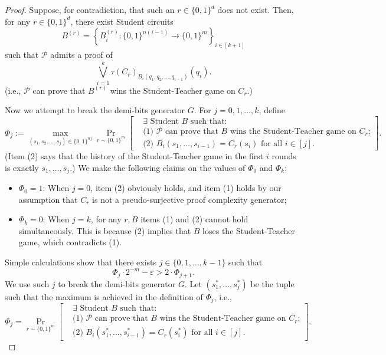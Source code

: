 \documentclass[10pt,a4paper]{article}
\theoremstyle{definition}
\theoremstyle{remark}
\newcommand{\eps}{\varepsilon}
\newcommand{\calP}{\mathcal{P}}
\begin{document}
\begin{proof}
    Suppose, for contradiction, that such an $r\in \{0,1\}^d$ does not exist. Then, for any $r\in\{0,1\}^d$, there exist Student circuits
    \[
        B^{(r)}=\left\{B_i^{(r)}\colon \{0,1\}^{n(i-1)}\to\{0,1\}^m\right\}_{i\in[k+1]}
    \]
    such that $\calP$ admits a proof of
    \[
        \bigvee_{i=1}^k\tau(C_r)_{B_{i}(q_1,q_2,\dots,q_{i-1})}(q_i).
    \]
    (i.e., $\calP$ can prove that $B^{(r)}$ wins the Student-Teacher game on $C_r$.)

    Now we attempt to break the demi-bits generator $G$. For $j=0,1,\dots,k$, define
    \[
        \Phi_j:=\max_{(s_1,s_2,\dots,s_j)\in\{0,1\}^{nj}}\Pr_{r\sim\{0,1\}^m}\left[\begin{aligned}
            &\text{$\exists$ Student $B$ such that:}\\
            &\text{(1) $\calP$ can prove that $B$ wins the Student-Teacher game on $C_r$;}\\
            &\text{(2) $B_i(s_1,\dots,s_{i-1})=C_r(s_i)$ for all $i\in[j]$.}
        \end{aligned}\right].
    \]
    (Item (2) says that the history of the Student-Teacher game in the first $i$ rounds is exactly $s_1,\dots,s_j$.) We make the following claims on the values of $\Phi_0$ and $\Phi_k$:
    \begin{itemize}
        \item $\Phi_0=1$: When $j=0$, item (2) obviously holds, and item (1) holds by our assumption that $C_r$ is not a pseudo-surjective proof complexity generator;
        \item $\Phi_k=0$: When $j=k$, for any $r,B$ items (1) and (2) cannot hold simultaneously. This is because (2) implies that $B$ loses the Student-Teacher game, which contradicts (1).
    \end{itemize}\par
    Simple calculations show that there exists $j\in\{0,1,\dots,k-1\}$ such that 
    \[
        \Phi_j\cdot 2^{-m}-\eps>2\cdot\Phi_{j+1}.
    \]
    We use such $j$ to break the demi-bits generator $G$. Let $(s_1^*,\dots,s_j^*)$ be the tuple such that the maximum is achieved in the definition of $\Phi_j$, i.e.,
    \[
        \Phi_j=\Pr_{r\sim\{0,1\}^m}\left[\begin{aligned}
            &\text{$\exists$ Student $B$ such that:}\\
            &\text{(1) $\calP$ can prove that $B$ wins the Student-Teacher game on $C_r$;}\\
            &\text{(2) $B_i(s_1^*,\dots,s_{i-1}^*)=C_r(s_{i}^*)$ for all $i\in[j]$.}
        \end{aligned}\right].
    \]
    

\end{proof}
\end{document}
